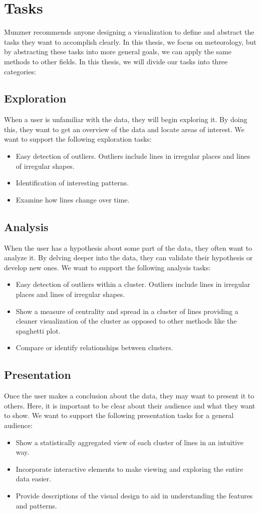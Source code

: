 \section{Tasks}
Munzner\cite{munzner2014} recommends anyone designing a visualization to define and abstract the tasks they want to accomplish clearly. In this thesis, we focus on meteorology, but by abstracting these tasks into more general goals, we can apply the same methods to other fields. In this thesis, we will divide our tasks into three categories:
\subsection{Exploration}
When a user is unfamiliar with the data, they will begin exploring it. By doing this, they want to get an overview of the data and locate areas of interest. We want to support the following exploration tasks:
\begin{itemize}
    \item Easy detection of outliers. Outliers include lines in irregular places and lines of irregular shapes.
    \item Identification of interesting patterns.
    \item Examine how lines change over time.
\end{itemize}
\subsection{Analysis}
When the user has a hypothesis about some part of the data, they often want to analyze it. By delving deeper into the data, they can validate their hypothesis or develop new ones. We want to support the following analysis tasks:
\begin{itemize}
    \item Easy detection of outliers within a cluster. Outliers include lines in irregular places and lines of irregular shapes.
    \item Show a measure of centrality and spread in a cluster of lines providing a cleaner visualization of the cluster as opposed to other methods like the spaghetti plot.
    \item Compare or identify relationships between clusters.
\end{itemize}
\subsection{Presentation}
Once the user makes a conclusion about the data, they may want to present it to others. Here, it is important to be clear about their audience and what they want to show. We want to support the following presentation tasks for a general audience:
\begin{itemize}
    \item Show a statistically aggregated view of each cluster of lines in an intuitive way.
    \item Incorporate interactive elements to make viewing and exploring the entire data easier.
    \item Provide descriptions of the visual design to aid in understanding the features and patterns.
\end{itemize}

